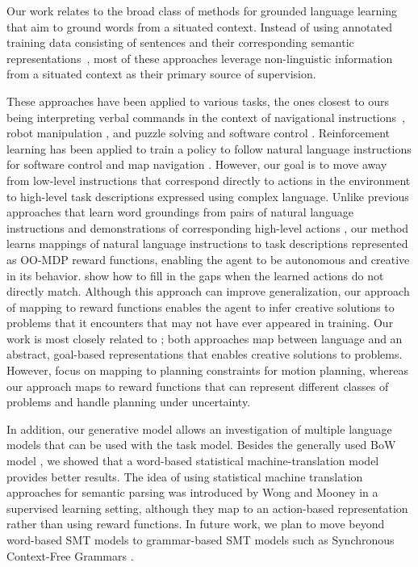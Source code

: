 \documentclass[conference]{IEEEtran}
\begin{document}
Our work relates to the broad class of methods for grounded language learning that aim to ground words from a situated context.
Instead of using annotated training data consisting of sentences and their corresponding semantic representations~\cite{kate06,wong07,zettlemoyer05,zettlemoyer09}, 
most of these approaches leverage non-linguistic information from a situated context as their primary source of supervision. 

These approaches have been applied to various tasks, the ones  closest to ours being interpreting verbal commands in the context of navigational instructions~\cite{vogel10,chen11,grubb11}, robot manipulation \cite{duvallet2013,tellex14,howard14},
and puzzle solving and software control \cite{bkr10}.
 Reinforcement learning has been applied to train a policy to follow natural language instructions for software control
and map navigation \cite{vogel10}. However, our goal is to move away from low-level instructions that correspond directly to actions in the environment
to high-level task descriptions expressed using complex language.
Unlike previous approaches that learn word groundings from pairs of
natural language instructions and demonstrations of corresponding high-level
actions \cite{tellex14,duvallet2013}, our method learns mappings
of natural language instructions to task descriptions represented as
OO-MDP reward functions, enabling the agent to be autonomous and creative
in its behavior.  \citet{misra14} show how to fill
in the gaps when the learned actions do not directly match.  Although
this approach can improve generalization, our approach of mapping to
reward functions enables the agent to infer creative solutions to
problems that it encounters that may not have ever appeared in
training.  Our work is most closely related to \citet{howard14}; both approaches map
between language and an abstract, goal-based representations that
enables creative solutions to problems. However, \citet{howard14}
focus on mapping to planning constraints for motion planning, whereas our 
approach maps to reward functions that can represent different classes
of problems and handle planning under uncertainty.

In addition, our generative model allows an investigation of multiple
language models that can be used with the task model. Besides the
generally used BoW model \cite{bkr09,vogel10}, we showed that
a word-based statistical machine-translation model provides better
results. The idea of using statistical machine translation approaches
for semantic parsing was introduced by Wong and Mooney \cite{wong07}
in a supervised learning setting, although they map to an action-based
representation rather than using reward functions. In future work, we
plan to move beyond word-based SMT models to grammar-based SMT models
such as Synchronous Context-Free Grammars \cite{Wu1997}.
\end{document}
